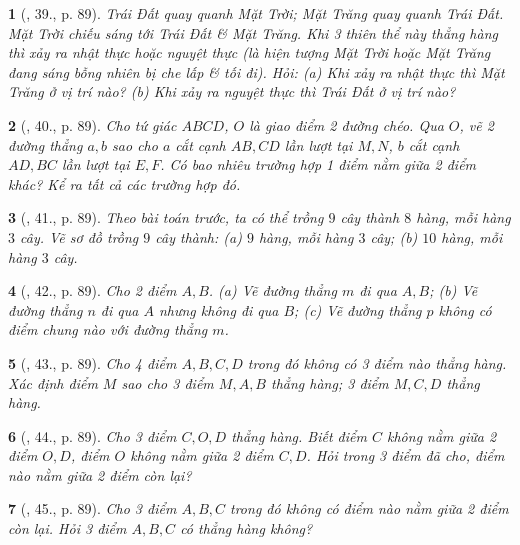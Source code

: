 \documentclass{article}
\newtheorem{baitoan}{}
\begin{document}
\begin{baitoan}[\cite{Tuyen_Toan_6}, 39., p. 89]
	Trái Đất quay quanh Mặt Trời; Mặt Trăng quay quanh Trái Đất. Mặt Trời chiếu sáng tới Trái Đất \& Mặt Trăng. Khi 3 thiên thể này thẳng hàng thì xảy ra nhật thực hoặc nguyệt thực (là hiện tượng Mặt Trời hoặc Mặt Trăng đang sáng bỗng nhiên bị che lấp \& tối đi). Hỏi: (a) Khi xảy ra nhật thực thì Mặt Trăng ở vị trí nào? (b) Khi xảy ra nguyệt thực thì Trái Đất ở vị trí nào?
\end{baitoan}

\begin{baitoan}[\cite{Tuyen_Toan_6}, 40., p. 89]
	Cho tứ giác $ABCD$, $O$ là giao điểm 2 đường chéo. Qua $O$, vẽ 2 đường thẳng $a,b$ sao cho $a$ cắt cạnh $AB,CD$ lần lượt tại $M,N$, $b$ cắt cạnh $AD,BC$ lần lượt tại $E,F$. Có bao nhiêu trường hợp 1 điểm nằm giữa 2 điểm khác? Kể ra tất cả các trường hợp đó.
\end{baitoan}

\begin{baitoan}[\cite{Tuyen_Toan_6}, 41., p. 89]
	Theo bài toán trước, ta có thể trồng $9$ cây thành $8$ hàng, mỗi hàng $3$ cây. Vẽ sơ đồ trồng $9$ cây thành: (a) $9$ hàng, mỗi hàng $3$ cây; (b) $10$ hàng, mỗi hàng $3$ cây.
\end{baitoan}

\begin{baitoan}[\cite{Tuyen_Toan_6}, 42., p. 89]
	Cho 2 điểm $A,B$. (a) Vẽ đường thẳng $m$ đi qua $A,B$; (b) Vẽ đường thẳng $n$ đi qua $A$ nhưng không đi qua $B$; (c) Vẽ đường thẳng $p$ không có điểm chung nào với đường thẳng $m$.
\end{baitoan}

\begin{baitoan}[\cite{Tuyen_Toan_6}, 43., p. 89]
	Cho 4 điểm $A,B,C,D$ trong đó không có 3 điểm nào thẳng hàng. Xác định điểm $M$ sao cho 3 điểm $M,A,B$ thẳng hàng; 3 điểm $M,C,D$ thẳng hàng.
\end{baitoan}

\begin{baitoan}[\cite{Tuyen_Toan_6}, 44., p. 89]
	Cho 3 điểm $C,O,D$ thẳng hàng. Biết điểm $C$ không nằm giữa 2 điểm $O,D$, điểm $O$ không nằm giữa 2 điểm $C,D$. Hỏi trong 3 điểm đã cho, điểm nào nằm giữa 2 điểm còn lại?
\end{baitoan}

\begin{baitoan}[\cite{Tuyen_Toan_6}, 45., p. 89]
	Cho 3 điểm $A,B,C$ trong đó không có điểm nào nằm giữa 2 điểm còn lại. Hỏi 3 điểm $A,B,C$ có thẳng hàng không?
\end{baitoan}
\end{document}
